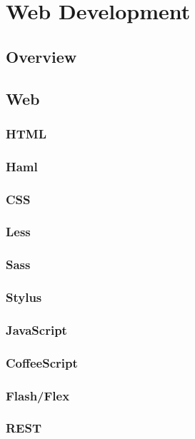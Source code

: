 \part{Web Development}

\chapter{Overview}



\chapter{Web}



\section{HTML}



\section{Haml}


\section{CSS}



\section{Less}


\section{Sass}



\section{Stylus}



\section{JavaScript}



\section{CoffeeScript}



\section{Flash/Flex}



\section{REST}









